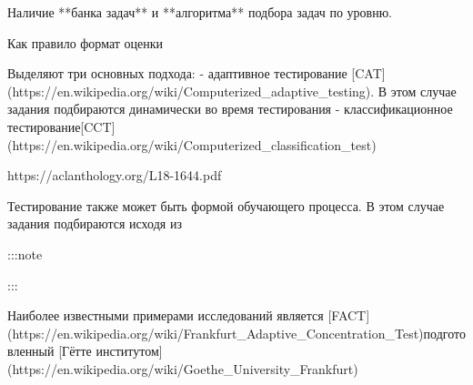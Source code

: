 Наличие **банка задач** и **алгоритма** подбора задач по уровню.

Как правило формат оценки

Выделяют три основных подхода:
- адаптивное тестирование [CAT](https://en.wikipedia.org/wiki/Computerized_adaptive_testing).
 В этом случае задания подбираются динамически во время тестирования
- классификационное тестирование[CCT](https://en.wikipedia.org/wiki/Computerized_classification_test)








https://aclanthology.org/L18-1644.pdf



Тестирование также может быть формой обучающего процесса. В этом случае задания подбираются исходя из 

:::note


:::


Наиболее известными примерами исследований является [FACT](https://en.wikipedia.org/wiki/Frankfurt_Adaptive_Concentration_Test)подготовленный [Гётте институтом](https://en.wikipedia.org/wiki/Goethe_University_Frankfurt)  
